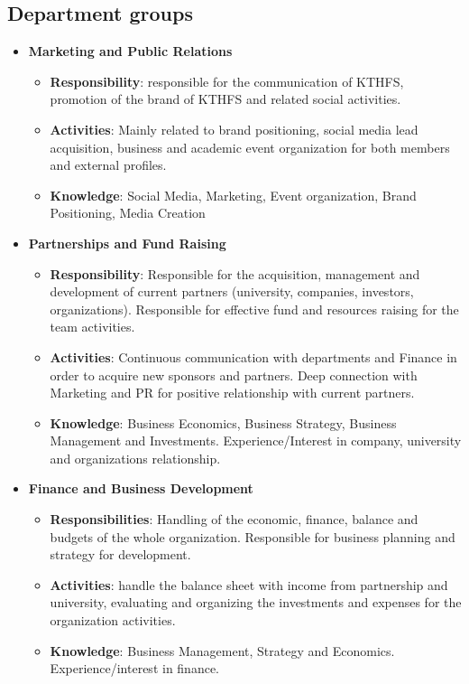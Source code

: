 \documentclass[graybox]{svmult}
\begin{document}
\subsection{Department groups}
\begin{itemize}
    \item \textbf{Marketing and Public Relations}
    \begin{itemize}
        \item \textbf{Responsibility}: responsible for the communication of KTHFS, promotion of the brand of KTHFS and related social activities.
        \item \textbf{Activities}: Mainly related to brand positioning, social media lead acquisition, business and academic event organization for both members and external profiles.
        \item \textbf{Knowledge}: Social Media, Marketing, Event organization, Brand Positioning, Media Creation
    \end{itemize}
    \item \textbf{Partnerships and Fund Raising}
    \begin{itemize}
        \item \textbf{Responsibility}: Responsible for the acquisition, management and development of current partners (university, companies, investors, organizations). Responsible for effective fund and resources raising for the team activities.
        \item \textbf{Activities}: Continuous communication with departments and Finance in order to acquire new sponsors and partners. Deep connection with Marketing and PR for positive relationship with current partners. 
        \item \textbf{Knowledge}: Business Economics, Business Strategy, Business Management and Investments. Experience/Interest in company, university and organizations relationship.
    \end{itemize}
    \item \textbf{Finance and Business Development}
    \begin{itemize}
        \item \textbf{Responsibilities}: Handling of the economic, finance, balance and budgets of the whole organization. Responsible for business planning and strategy for development. 
        \item \textbf{Activities}: handle the balance sheet with income from partnership and university, evaluating and organizing the investments and expenses for the organization activities.
        \item \textbf{Knowledge}: Business Management, Strategy and Economics. Experience/interest in finance.
    \end{itemize}
\end{itemize}
\end{document}
